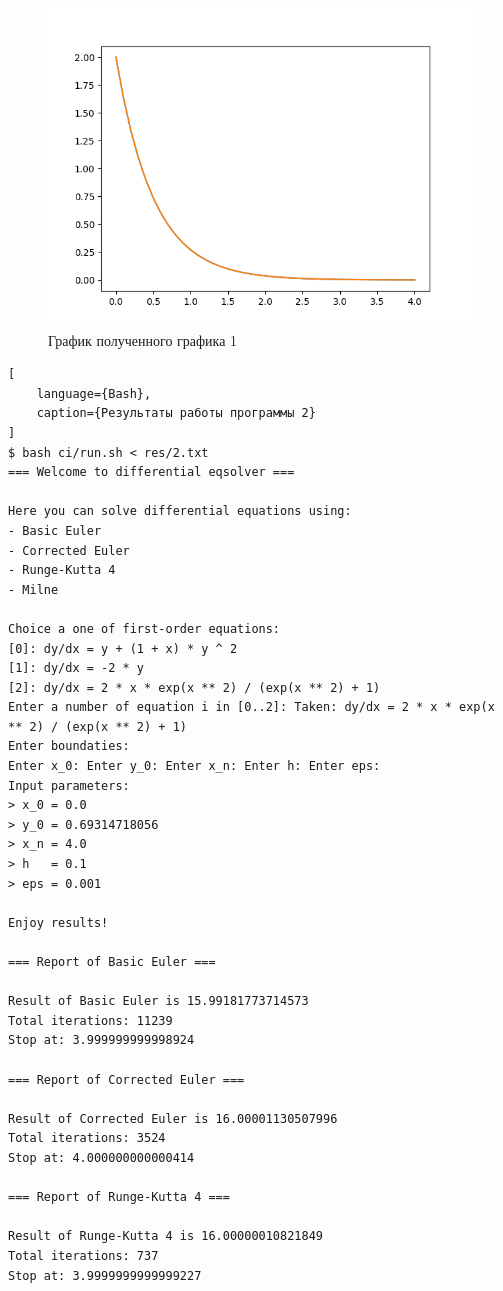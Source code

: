 \documentclass{article}
\begin{document}
\begin{figure}[h]
    \centering
    \includegraphics[totalheight=8cm]{figure-1.png}
    \caption{График полученного графика 1}
\end{figure}

\begin{lstlisting}[
    language={Bash},
    caption={Результаты работы программы 2}
]
$ bash ci/run.sh < res/2.txt
=== Welcome to differential eqsolver ===

Here you can solve differential equations using:
- Basic Euler
- Corrected Euler
- Runge-Kutta 4
- Milne

Choice a one of first-order equations:
[0]: dy/dx = y + (1 + x) * y ^ 2
[1]: dy/dx = -2 * y
[2]: dy/dx = 2 * x * exp(x ** 2) / (exp(x ** 2) + 1)
Enter a number of equation i in [0..2]: Taken: dy/dx = 2 * x * exp(x ** 2) / (exp(x ** 2) + 1)
Enter boundaties: 
Enter x_0: Enter y_0: Enter x_n: Enter h: Enter eps: 
Input parameters: 
> x_0 = 0.0
> y_0 = 0.69314718056
> x_n = 4.0
> h   = 0.1
> eps = 0.001

Enjoy results!

=== Report of Basic Euler === 

Result of Basic Euler is 15.99181773714573
Total iterations: 11239
Stop at: 3.999999999998924

=== Report of Corrected Euler === 

Result of Corrected Euler is 16.00001130507996
Total iterations: 3524
Stop at: 4.000000000000414

=== Report of Runge-Kutta 4 === 

Result of Runge-Kutta 4 is 16.00000010821849
Total iterations: 737
Stop at: 3.9999999999999227
\end{lstlisting}
\end{document}
